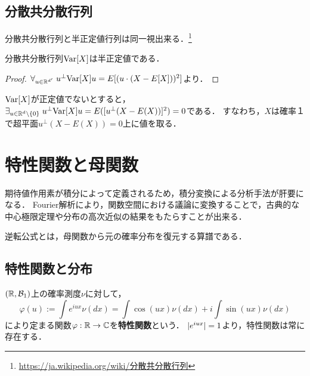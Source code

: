 \documentclass[uplatex,dvipdfmx]{jsreport}
\begin{document}
\subsection{分散共分散行列}

\begin{tcolorbox}[colframe=ForestGreen, colback=ForestGreen!10!white,breakable,colbacktitle=ForestGreen!40!white,coltitle=black,fonttitle=\bfseries\sffamily,
title=]
    分散共分散行列と半正定値行列は同一視出来る．\footnote{\url{https://ja.wikipedia.org/wiki/分散共分散行列}}
\end{tcolorbox}

\begin{lemma}
    分散共分散行列$\mathrm{Var}[X]$は半正定値である．
\end{lemma}
\begin{proof}
    $\forall_{u\in\mathbb{R}^{d'}}\;u^\perp\mathrm{Var}[X]u=E[(u\cdot(X-E[X]))^2]$より．
\end{proof}
\begin{remark}[退化した多次元確率変数]
    $\mathrm{Var}[X]$が正定値でないとすると，$\exists_{u\in\mathbb{R}^d\setminus\{0\}}\;u^\perp\mathrm{Var}[X]u=E([u^\perp(X-E(X))]^2)=0$である．
    すなわち，$X$は確率１で超平面$u^\perp(X-E(X))=0$上に値を取る．
\end{remark}

\section{特性関数と母関数}

\begin{tcolorbox}[colframe=ForestGreen, colback=ForestGreen!10!white,breakable,colbacktitle=ForestGreen!40!white,coltitle=black,fonttitle=\bfseries\sffamily,
title=積分変換]
    期待値作用素が積分によって定義されるため，積分変換による分析手法が肝要になる．
    Fourier解析により，関数空間における議論に変換することで，古典的な中心極限定理や分布の高次近似の結果をもたらすことが出来る．

    逆転公式とは，母関数から元の確率分布を復元する算譜である．
\end{tcolorbox}

\subsection{特性関数と分布}

\begin{definition}
    $(\mathbb{R},\mathcal{B}_1)$上の確率測度$\nu$に対して，
    \[\varphi(u):=\int e^{iux}\nu(dx)=\int\cos(ux)\nu(dx)+i\int\sin(ux)\nu(dx)\]
    により定まる関数$\varphi:\mathbb{R}\to\mathbb{C}$を\textbf{特性関数}という．
    $\lvert e^{iux}\rvert=1$より，特性関数は常に存在する．
\end{definition}
\end{document}
